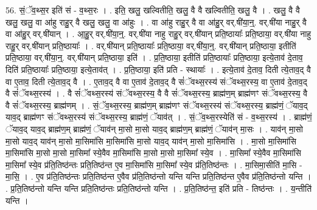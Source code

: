 \documentclass[17pt]{extarticle}
\begin{document}
56. सं॒ॅव॒थ्स॒र इति॑ सं - व॒थ्स॒रः । . इति॒ खलु॒ खल्वितीति॒ खलु॒ वै वै खल्वितीति॒ खलु॒ वै । . खलु॒ वै वै खलु॒ खलु॒ वा आ॑हु राहु॒र् वै खलु॒ खलु॒ वा आ॑हुः । . वा आ॑हु राहु॒र् वै वा आ॑हु॒र् वर्.षी॑या॒न्॒. वर्.षी॑या नाहु॒र् वै वा आ॑हु॒र् वर्.षी॑यान् । . आ॒हु॒र् वर्.षी॑या॒न्॒. वर्.षी॑या नाहु राहु॒र् वर्.षी॑यान् प्रति॒ष्ठायाः᳚ प्रति॒ष्ठाया॒ वर्.षी॑या नाहु राहु॒र् वर्.षी॑यान् प्रति॒ष्ठायाः᳚ । . वर्.षी॑यान् प्रति॒ष्ठायाः᳚ प्रति॒ष्ठाया॒ वर्.षी॑या॒न्॒. वर्.षी॑यान् प्रति॒ष्ठाया॒ इतीति॑ प्रति॒ष्ठाया॒ वर्.षी॑या॒न्॒. वर्.षी॑यान् प्रति॒ष्ठाया॒ इति॑ । . प्र॒ति॒ष्ठाया॒ इतीति॑ प्रति॒ष्ठायाः᳚ प्रति॒ष्ठाया॒ इत्ये॒ताव॑ दे॒ताव॒ दिति॑ प्रति॒ष्ठायाः᳚ प्रति॒ष्ठाया॒ इत्ये॒ताव॑त् । . प्र॒ति॒ष्ठाया॒ इति॑ प्रति - स्थायाः᳚ । . इत्ये॒ताव॑ दे॒ताव॒ दिती त्ये॒ताव॒द् वै वा ए॒ताव॒ दिती त्ये॒ताव॒द् वै । . ए॒ताव॒द् वै वा ए॒ताव॑ दे॒ताव॒द् वै सं॑ॅवथ्स॒रस्य॑ संॅवथ्स॒रस्य॒ वा ए॒ताव॑ दे॒ताव॒द् वै सं॑ॅवथ्स॒रस्य॑ । . वै सं॑ॅवथ्स॒रस्य॑ संॅवथ्स॒रस्य॒ वै वै सं॑ॅवथ्स॒रस्य॒ ब्राह्म॑ण॒म् ब्राह्म॑णꣳ संॅवथ्स॒रस्य॒ वै वै सं॑ॅवथ्स॒रस्य॒ ब्राह्म॑णम् । . सं॒ॅव॒थ्स॒रस्य॒ ब्राह्म॑ण॒म् ब्राह्म॑णꣳ संॅवथ्स॒रस्य॑ संॅवथ्स॒रस्य॒ ब्राह्म॑णं॒ ॅयाव॒द् याव॒द् ब्राह्म॑णꣳ संॅवथ्स॒रस्य॑ संॅवथ्स॒रस्य॒ ब्राह्म॑णं॒ ॅयाव॑त् । . सं॒ॅव॒थ्स॒रस्येति॑ सं - व॒थ्स॒रस्य॑ । . ब्राह्म॑णं॒ ॅयाव॒द् याव॒द् ब्राह्म॑ण॒म् ब्राह्म॑णं॒ ॅयाव॑न् मा॒सो मा॒सो याव॒द् ब्राह्म॑ण॒म् ब्राह्म॑णं॒ ॅयाव॑न् मा॒सः । . याव॑न् मा॒सो मा॒सो याव॒द् याव॑न् मा॒सो मा॒सिमा॑सि मा॒सिमा॑सि मा॒सो याव॒द् याव॑न् मा॒सो मा॒सिमा॑सि । . मा॒सो मा॒सिमा॑सि मा॒सिमा॑सि मा॒सो मा॒सो मा॒सिमा᳚ स्ये॒वैव मा॒सिमा॑सि मा॒सो मा॒सो मा॒सिमा᳚ स्ये॒व । . मा॒सिमा᳚ स्ये॒वैव मा॒सिमा॑सि मा॒सिमा᳚ स्ये॒व प्र॑ति॒तिष्ठ॑न्तः प्रति॒तिष्ठ॑न्त ए॒व मा॒सिमा॑सि मा॒सिमा᳚ स्ये॒व प्र॑ति॒तिष्ठ॑न्तः । . मा॒सिमा॒सीति॑ मा॒सि - मा॒सि॒ । . ए॒व प्र॑ति॒तिष्ठ॑न्तः प्रति॒तिष्ठ॑न्त ए॒वैव प्र॑ति॒तिष्ठ॑न्तो यन्ति यन्ति प्रति॒तिष्ठ॑न्त ए॒वैव प्र॑ति॒तिष्ठ॑न्तो यन्ति । . प्र॒ति॒तिष्ठ॑न्तो यन्ति यन्ति प्रति॒तिष्ठ॑न्तः प्रति॒तिष्ठ॑न्तो यन्ति । . प्र॒ति॒तिष्ठ॑न्त॒ इति॑ प्रति - तिष्ठ॑न्तः । . य॒न्तीति॑ यन्ति । \newline
\pagebreak
{}
\end{document}

